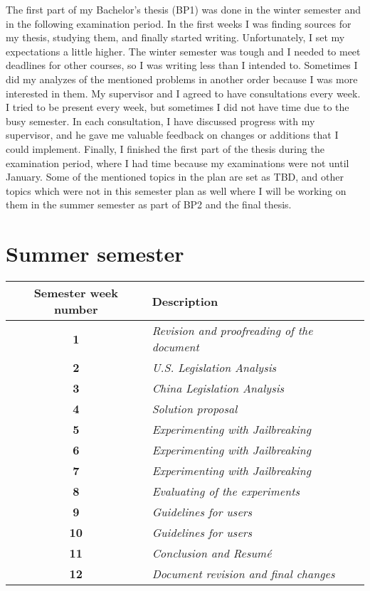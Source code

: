 The first part of my Bachelor's thesis (BP1) was done in the winter semester and in the following examination period. In the first weeks I was finding sources for my thesis, studying them, and finally started writing. Unfortunately, I set my expectations a little higher. The winter semester was tough and I needed to meet deadlines for other courses, so I was writing less than I intended to. Sometimes I did my analyzes of the mentioned problems in another order because I was more interested in them. My supervisor and I agreed to have consultations every week. I tried to be present every week, but sometimes I did not have time due to the busy semester. In each consultation, I have discussed progress with my supervisor, and he gave me valuable feedback on changes or additions that I could implement. Finally, I finished the first part of the thesis during the examination period, where I had time because my examinations were not until January. Some of the mentioned topics in the plan are set as TBD, and other topics which were not in this semester plan as well where I will be working on them in the summer semester as part of BP2 and the final thesis.


\newpage


\section*{Summer semester}

\begin{table}[htpb]
    \centering
    \begin{tabular}{|c|l|}
    \hline
    \cellcolor[gray]{0.8}\textbf{Semester week number} & \cellcolor[gray]{0.8}\textbf{Description} \\ \hline

    \textbf{1} & \textit{Revision and proofreading of the document} \\ \hline
    \textbf{2} & \textit{U.S. Legislation Analysis} \\ \hline
    \textbf{3} & \textit{China Legislation Analysis} \\ \hline
    \textbf{4} & \textit{Solution proposal} \\ \hline
    \textbf{5} & \textit{Experimenting with Jailbreaking} \\ \hline
    \textbf{6} & \textit{Experimenting with Jailbreaking} \\ \hline
    \textbf{7} & \textit{Experimenting with Jailbreaking} \\ \hline
    \textbf{8} & \textit{Evaluating of the experiments} \\ \hline
    \textbf{9} & \textit{Guidelines for users} \\ \hline
    \textbf{10} & \textit{Guidelines for users} \\ \hline
    \textbf{11} & \textit{Conclusion and Resumé} \\ \hline
    \textbf{12} & \textit{Document revision and final changes} \\ \hline
    \end{tabular}
\end{table}

